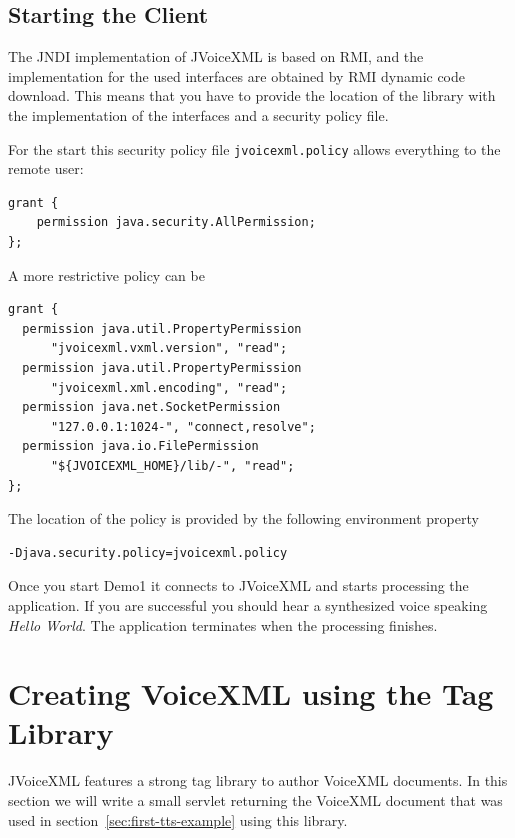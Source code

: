 \documentclass[11pt,a4paper]{article}
\begin{document}
\subsection{Starting the Client}
\label{sec:starting-client}

The JNDI implementation of JVoiceXML is based on RMI, and
the implementation for the used interfaces are obtained by
RMI dynamic code download. This means that you have to provide
the location of the library with the implementation of the
interfaces and a security policy file.

For the start this security policy file \texttt{jvoicexml.policy}
allows everything to the remote user:

\begin{lstlisting}
grant {
    permission java.security.AllPermission;
};
\end{lstlisting}

A more restrictive policy can be

\begin{lstlisting}
grant {
  permission java.util.PropertyPermission
      "jvoicexml.vxml.version", "read";
  permission java.util.PropertyPermission
      "jvoicexml.xml.encoding", "read";
  permission java.net.SocketPermission
      "127.0.0.1:1024-", "connect,resolve";
  permission java.io.FilePermission
      "${JVOICEXML_HOME}/lib/-", "read";
};
\end{lstlisting}

The location of the policy is provided by the following environment property

\begin{lstlisting}
-Djava.security.policy=jvoicexml.policy
\end{lstlisting}

Once you start Demo1 it connects to JVoiceXML and starts processing
the application. If you are successful you should hear a synthesized voice
speaking \emph{Hello World}. The application terminates when the processing
finishes.

\section{Creating VoiceXML using the Tag Library}

JVoiceXML features a strong tag library to author VoiceXML documents. In
this section we will write a small servlet returning the VoiceXML document that
was used in section~\ref{sec:first-tts-example} using this library.
\end{document}
